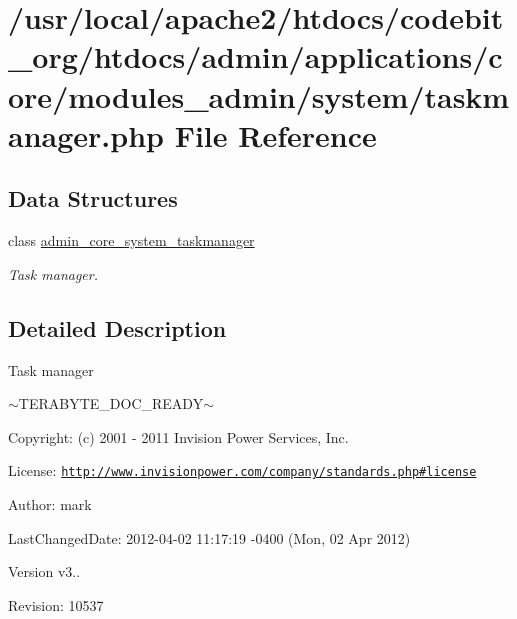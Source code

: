 \hypertarget{taskmanager_8php}{\section{/usr/local/apache2/htdocs/codebit\-\_\-org/htdocs/admin/applications/core/modules\-\_\-admin/system/taskmanager.php File Reference}
\label{taskmanager_8php}
}
\subsection*{Data Structures}
\begin{DoxyCompactItemize}
\item 
class \hyperlink{classadmin__core__system__taskmanager}{admin\-\_\-core\-\_\-system\-\_\-taskmanager}
\begin{DoxyCompactList}\small\item\em Task manager. \end{DoxyCompactList}\end{DoxyCompactItemize}


\subsection{Detailed Description}
\begin{DoxyVerb}  Task manager
\end{DoxyVerb}
 $\sim$\-T\-E\-R\-A\-B\-Y\-T\-E\-\_\-\-D\-O\-C\-\_\-\-R\-E\-A\-D\-Y$\sim$ \begin{DoxyParagraph}{Copyright\-:}
(c) 2001 -\/ 2011 Invision Power Services, Inc.
\end{DoxyParagraph}
\begin{DoxyParagraph}{License\-:}
\href{http://www.invisionpower.com/company/standards.php#license}{\tt http\-://www.\-invisionpower.\-com/company/standards.\-php\#license}
\end{DoxyParagraph}
\begin{DoxyParagraph}{Author\-:}
mark 
\end{DoxyParagraph}
\begin{DoxyParagraph}{Last\-Changed\-Date\-:}
2012-\/04-\/02 11\-:17\-:19 -\/0400 (Mon, 02 Apr 2012) 
\end{DoxyParagraph}
\begin{DoxyVersion}{Version}
v3.. 
\end{DoxyVersion}
\begin{DoxyParagraph}{Revision\-:}
10537 
\end{DoxyParagraph}


